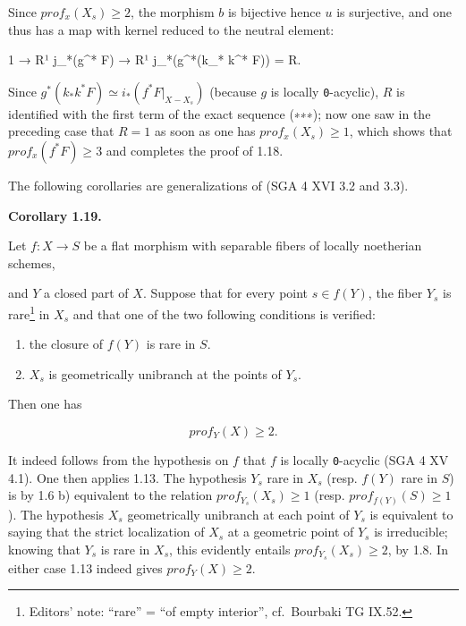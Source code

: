 \documentclass[
]{article}
\newenvironment{Shaded}{}{}
\newcommand{\NormalTok}[1]{#1}
\begin{document}
Since \(prof_{x}(X_{s}) \geqslant 2\), the morphism \(b\) is bijective
hence \(u\) is surjective, and one thus has a map with kernel reduced to
the neutral element:

\begin{Shaded}
\begin{Highlighting}[]
\NormalTok{1 → R¹ j\_*(g\^{}* F) → R¹ j\_*(g\^{}*(k\_* k\^{}* F)) = R.}
\end{Highlighting}
\end{Shaded}

Since \(g^{*}(k_{*} k^{*} F) \simeq i_{*}(f^{*} F|_{X - X_{s}})\)
(because \(g\) is locally \texttt{0}-acyclic), \(R\) is identified with
the first term of the exact sequence (∗∗∗); now one saw in the preceding
case that \(R = 1\) as soon as one has \(prof_{x}(X_{s}) \geqslant 1\),
which shows that \(prof_{x}(f^{*} F) \geqslant 3\) and completes the
proof of 1.18.

The following corollaries are generalizations of (SGA 4 XVI 3.2 and
3.3).

\textbf{Corollary 1.19.}

Let \(f : X \to S\) be a flat morphism with separable fibers of locally
noetherian schemes,

and \(Y\) a closed part of \(X\). Suppose that for every point
\(s \in f(Y)\), the fiber \(Y_{s}\) is rare\footnote{Editors' note:
  ``rare'' = ``of empty interior'', cf.~Bourbaki TG IX.52.} in \(X_{s}\)
and that one of the two following conditions is verified:

\begin{enumerate}
\def\labelenumi{\alph{enumi})}
\item
  the closure of \(f(Y)\) is rare in \(S\).
\item
  \(X_{s}\) is geometrically unibranch at the points of \(Y_{s}\).
\end{enumerate}

Then one has

\[
prof_{Y}(X) \geqslant 2.
\]

It indeed follows from the hypothesis on \(f\) that \(f\) is locally
\texttt{0}-acyclic (SGA 4 XV 4.1). One then applies 1.13. The hypothesis
\(Y_{s}\) rare in \(X_{s}\) (resp. \(f(Y)\) rare in \(S\)) is by 1.6 b)
equivalent to the relation \(prof_{Y_{s}}(X_{s}) \geqslant 1\) (resp.
\(prof_{f(Y)}(S) \geqslant 1\)). The hypothesis \(X_{s}\) geometrically
unibranch at each point of \(Y_{s}\) is equivalent to saying that the
strict localization of \(X_{s}\) at a geometric point of \(Y_{s}\) is
irreducible; knowing that \(Y_{s}\) is rare in \(X_{s}\), this evidently
entails \(prof_{Y_{s}}(X_{s}) \geqslant 2\), by 1.8. In either case 1.13
indeed gives \(prof_{Y}(X) \geqslant 2\).
\end{document}
